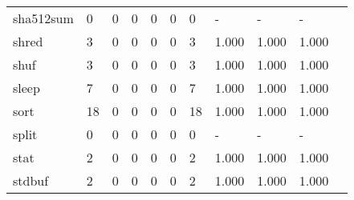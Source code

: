 \begin{longtable}{lp{1.10cm}p{1.10cm}p{1.10cm}p{1.10cm}p{1.10cm}p{1.10cm}p{1.10cm}p{1.10cm}p{1.10cm}p{1.10cm}}
sha512sum &                      0 &                                  0 &                                 0 &                                0 &                                 0 &                               0 &                              - &                                     - &                                   - \\
shred     &                      3 &                                  0 &                                 0 &                                0 &                                 0 &                               3 &                          1.000 &                                 1.000 &                               1.000 \\
shuf      &                      3 &                                  0 &                                 0 &                                0 &                                 0 &                               3 &                          1.000 &                                 1.000 &                               1.000 \\
sleep     &                      7 &                                  0 &                                 0 &                                0 &                                 0 &                               7 &                          1.000 &                                 1.000 &                               1.000 \\
sort      &                     18 &                                  0 &                                 0 &                                0 &                                 0 &                              18 &                          1.000 &                                 1.000 &                               1.000 \\
split     &                      0 &                                  0 &                                 0 &                                0 &                                 0 &                               0 &                              - &                                     - &                                   - \\
stat      &                      2 &                                  0 &                                 0 &                                0 &                                 0 &                               2 &                          1.000 &                                 1.000 &                               1.000 \\
stdbuf    &                      2 &                                  0 &                                 0 &                                0 &                                 0 &                               2 &                          1.000 &                                 1.000 &                               1.000 \\

\end{longtable}
